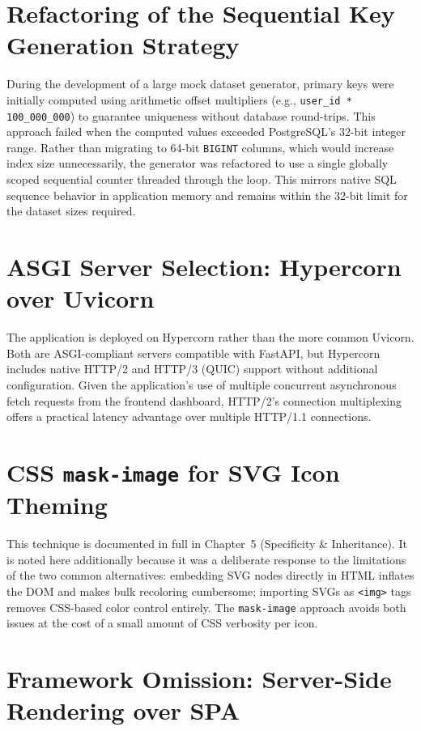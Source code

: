 \documentclass[11pt,a4paper]{book}
\begin{document}
\section{Refactoring of the Sequential Key Generation Strategy}

During the development of a large mock dataset generator, primary keys were initially computed using arithmetic offset multipliers (e.g., \texttt{user\_id * 100\_000\_000}) to guarantee uniqueness without database round-trips. This approach failed when the computed values exceeded PostgreSQL's 32-bit integer range. Rather than migrating to 64-bit \texttt{BIGINT} columns, which would increase index size unnecessarily, the generator was refactored to use a single globally scoped sequential counter threaded through the loop. This mirrors native SQL sequence behavior in application memory and remains within the 32-bit limit for the dataset sizes required.

\section{ASGI Server Selection: Hypercorn over Uvicorn}

The application is deployed on Hypercorn rather than the more common Uvicorn. Both are ASGI-compliant servers compatible with FastAPI, but Hypercorn includes native HTTP/2 and HTTP/3 (QUIC) support without additional configuration. Given the application's use of multiple concurrent asynchronous fetch requests from the frontend dashboard, HTTP/2's connection multiplexing offers a practical latency advantage over multiple HTTP/1.1 connections.

\section{CSS \texttt{mask-image} for SVG Icon Theming}

This technique is documented in full in Chapter~5 (Specificity \& Inheritance). It is noted here additionally because it was a deliberate response to the limitations of the two common alternatives: embedding SVG nodes directly in HTML inflates the DOM and makes bulk recoloring cumbersome; importing SVGs as \texttt{<img>} tags removes CSS-based color control entirely. The \texttt{mask-image} approach avoids both issues at the cost of a small amount of CSS verbosity per icon.

\section{Framework Omission: Server-Side Rendering over SPA}
\end{document}
